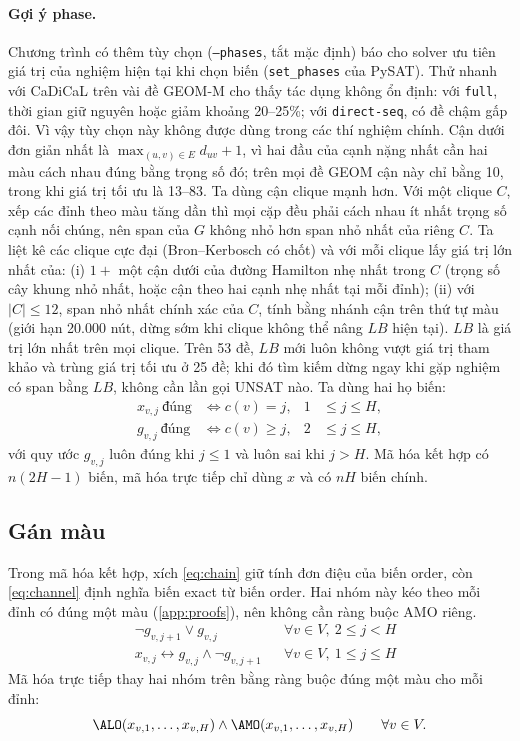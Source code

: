 \paragraph{Gợi ý phase.} Chương trình có thêm tùy chọn (\texttt{--phases}, tắt mặc định) báo cho solver ưu tiên giá trị của nghiệm hiện tại khi chọn biến (\texttt{set\_phases} của PySAT). Thử nhanh với CaDiCaL trên vài đề GEOM-M cho thấy tác dụng không ổn định: với \texttt{full}, thời gian giữ nguyên hoặc giảm khoảng 20--25\%; với \texttt{direct-seq}, có đề chậm gấp đôi. Vì vậy tùy chọn này không được dùng trong các thí nghiệm chính. Cận dưới đơn giản nhất là $\max_{(u,v)\in E}d_{uv}+1$, vì hai đầu của cạnh nặng nhất cần hai màu cách nhau đúng bằng trọng số đó; trên mọi đề GEOM cận này chỉ bằng 10, trong khi giá trị tối ưu là 13--83. Ta dùng cận clique mạnh hơn. Với một clique $C$, xếp các đỉnh theo màu tăng dần thì mọi cặp đều phải cách nhau ít nhất trọng số cạnh nối chúng, nên span của $G$ không nhỏ hơn span nhỏ nhất của riêng $C$. Ta liệt kê các clique cực đại (Bron--Kerbosch có chốt) và với mỗi clique lấy giá trị lớn nhất của: (i) $1+$ một cận dưới của đường Hamilton nhẹ nhất trong $C$ (trọng số cây khung nhỏ nhất, hoặc cận theo hai cạnh nhẹ nhất tại mỗi đỉnh); (ii) với $|C|\le 12$, span nhỏ nhất chính xác của $C$, tính bằng nhánh cận trên thứ tự màu (giới hạn 20.000 nút, dừng sớm khi clique không thể nâng $LB$ hiện tại). $LB$ là giá trị lớn nhất trên mọi clique. Trên 53 đề, $LB$ mới luôn không vượt giá trị tham khảo và trùng giá trị tối ưu ở 25 đề; khi đó tìm kiếm dừng ngay khi gặp nghiệm có span bằng $LB$, không cần lần gọi UNSAT nào. Ta dùng hai họ biến:
\begin{align}
x_{v,j}\ \text{đúng} &\iff c(v)=j, & 1&\le j\le H, \label{eq:varx}\\
g_{v,j}\ \text{đúng} &\iff c(v)\ge j, & 2&\le j\le H, \label{eq:varg}
\end{align}
với quy ước $g_{v,j}$ luôn đúng khi $j\le1$ và luôn sai khi $j>H$. Mã hóa kết hợp có $n(2H-1)$ biến, mã hóa trực tiếp chỉ dùng $x$ và có $nH$ biến chính.

\subsection{Gán màu}\label{sec:assign}

Trong mã hóa kết hợp, xích \eqref{eq:chain} giữ tính đơn điệu của biến order, còn \eqref{eq:channel} định nghĩa biến exact từ biến order. Hai nhóm này kéo theo mỗi đỉnh có đúng một màu (\ref{app:proofs}), nên không cần ràng buộc AMO riêng.
\begin{align}
& \neg g_{v,j+1}\vee g_{v,j} && \forall v\in V,\ 2\le j<H \label{eq:chain}\\
& x_{v,j}\leftrightarrow g_{v,j}\wedge\neg g_{v,j+1} && \forall v\in V,\ 1\le j\le H \label{eq:channel}
\end{align}
Mã hóa trực tiếp thay hai nhóm trên bằng ràng buộc đúng một màu cho mỗi đỉnh:
\begin{equation}
\ALO(x_{v,1},\dots,x_{v,H})\wedge\AMO(x_{v,1},\dots,x_{v,H})\qquad\forall v\in V. \label{eq:direct}
\end{equation}

